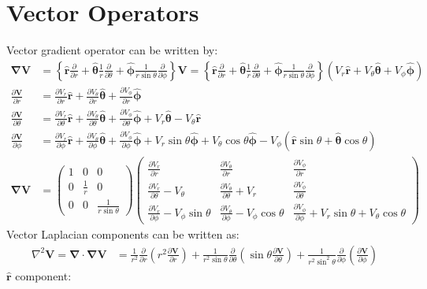 \documentclass[MSc,beforeExam]{iitcsthesis}
\newcommand{\deriv}[2]{\frac{\partial #1}{\partial #2}}
\newcommand{\mat}[2]{\left(\begin{array}{#1}#2\end{array}\right)}
\newcommand\Laplacian{\nabla^2}
\newcommand\bnabla{\boldsymbol{\nabla}}
\newcommand\bV{\boldsymbol{V}}
\newcommand\br{\boldsymbol{r}}
\newcommand\brhat{\hat{\br}}
\newcommand\btheta{\boldsymbol{\theta}}
\newcommand\bthetahat{\hat{\btheta}}
\newcommand\bphi{\boldsymbol{\phi}}
\newcommand\bphihat{\hat{\bphi}}
\begin{document}
\section{Vector Operators}
Vector gradient operator can be written by:
\begin{align} \nonumber
\bnabla\bV &= \left\{ \brhat \deriv{}{r} +
\bthetahat \frac{1}{r} \deriv{}{\theta} +
\bphihat \frac{1}{r \sin\theta} \deriv{}{\phi} \right\}
\bV = \left\{ \brhat \deriv{}{r} +
\bthetahat \frac{1}{r} \deriv{}{\theta} +
\bphihat \frac{1}{r \sin\theta} \deriv{}{\phi} \right\}
\left( V_r \brhat + V_\theta \bthetahat + V_\phi \bphihat \right)
\\ \nonumber
\deriv{\bV}{r} &=
\deriv{V_r}{r}\brhat + \deriv{V_\theta}{r}\bthetahat + \deriv{V_\phi}{r}\bphihat
\\ 
\deriv{\bV}{\theta} &=
\deriv{V_r}{\theta}\brhat + \deriv{V_\theta}{\theta}\bthetahat + \deriv{V_\phi}{\theta}\bphihat
+ V_r\bthetahat - V_\theta\brhat
\\ \nonumber
\deriv{\bV}{\phi} &=
\deriv{V_r}{\phi}\brhat + \deriv{V_\theta}{\phi}\bthetahat + \deriv{V_\phi}{\phi}\bphihat
+ V_r \sin\theta\bphihat + V_\theta \cos\theta\bphihat -
V_\phi \left(\brhat \sin\theta + \bthetahat \cos\theta \right)
\\ \nonumber
\bnabla\bV &=
\mat{ccc}{1&0&0 \\ 0&\frac{1}{r}&0 \\ 0&0&\frac{1}{r \sin\theta}}
\mat{ccc}{
\deriv{V_r}{r} & \deriv{V_\theta}{r} & \deriv{V_\phi}{r} \\
\deriv{V_r}{\theta} - V_\theta &
\deriv{V_\theta}{\theta} + V_r&
\deriv{V_\phi}{\theta} \\
\deriv{V_r}{\phi} - V_\phi \sin\theta &
\deriv{V_\theta}{\phi} - V_\phi \cos\theta  &
\deriv{V_\phi}{\phi} + V_r \sin\theta + V_\theta \cos\theta
}
\end{align}
Vector Laplacian components can be written as:
\begin{align}
\Laplacian \bV = \bnabla \cdot \bnabla \bV &= \frac{1}{r^2}\deriv{}{r}\left(r^2 \deriv{\bV}{r}\right) +
\frac{1}{r^2\sin\theta}\deriv{}{\theta}\left(\sin\theta\deriv{\bV}{\theta}\right)+
\frac{1}{r^2 \sin^2\theta}\deriv{}{\phi}\left(\deriv{\bV}{\phi}\right)
\end{align}
$\brhat$ component:
\end{document}
